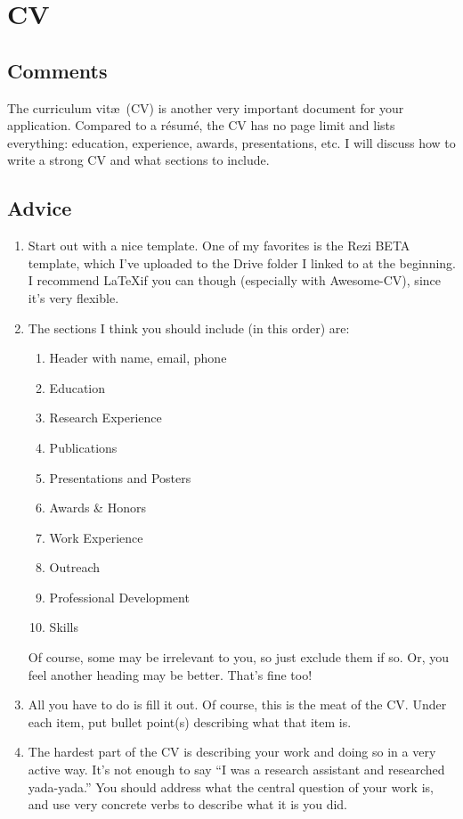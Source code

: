 \documentclass[12pt]{article}
\begin{document}
\section{CV}
\subsection{Comments}
The curriculum vit\ae\ (CV) is another very important document for your application. Compared to a r\'esum\'e, the CV has no page limit and lists everything: education, experience, awards, presentations, etc. I will discuss how to write a strong CV and what sections to include.

\subsection{Advice}
\begin{enumerate}
\item Start out with a nice template. One of my favorites is the Rezi BETA template, which I've uploaded to the Drive folder I linked to at the beginning. I recommend \LaTeX if you can though (especially with Awesome-CV), since it's very flexible.

\item The sections I think you should include (in this order) are:
\begin{enumerate}
\item Header with name, email, phone
\item Education
\item Research Experience
\item Publications 
\item Presentations and Posters 
\item Awards \& Honors 
\item Work Experience 
\item Outreach
\item Professional Development
\item Skills
\end{enumerate}
Of course, some may be irrelevant to you, so just exclude them if so. Or, you feel another heading may be better. That's fine too!

\item All you have to do is fill it out. Of course, this is the meat of the CV. Under each item, put bullet point(s) describing what that item is.

\item The hardest part of the CV is describing your work and doing so in a very active way. It's not enough to say ``I was a research assistant and researched yada-yada.'' You should address what the central question of your work is, and use very concrete verbs to describe what it is you did.


\end{enumerate}
\end{document}
